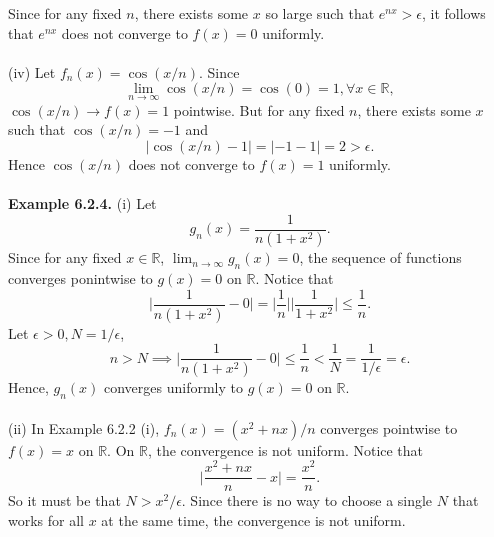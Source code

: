 \documentclass{article}
\begin{document}
           Since for any fixed $n$, there exists some $x$ so large such that $e^{nx} > \epsilon$, it follows that $e^{nx}$ does not converge to $f(x)=0$ uniformly.
           \\ \\
           (iv) Let $f_n(x) = \cos(x/n)$. Since
           \begin{equation*}
               \lim_{n \to \infty} \cos(x/n) = \cos(0) = 1, \forall x \in \mathbb{R},
           \end{equation*}
           $\cos(x/n) \to f(x)=1$ pointwise. But for any fixed $n$, there exists some $x$ such that $\cos(x/n)=-1$ and 
           \begin{equation*}
               |\cos(x/n)-1| = |-1-1| = 2 > \epsilon.
           \end{equation*}
           Hence $\cos(x/n)$ does not converge to $f(x)=1$ uniformly.
           \\ \\
           \textbf{Example 6.2.4.} (i) Let
           \begin{equation*}
               g_n(x) = \frac{1}{n(1+x^2)}.
           \end{equation*}
           Since for any fixed $x \in \mathbb{R}$, $\lim_{n \to \infty} g_n(x) = 0$, the sequence of functions converges ponintwise to $g(x)=0$ on $\mathbb{R}$. Notice that
           \begin{equation*}
               \bigg|\frac{1}{n(1+x^2)} - 0\bigg| = \bigg|\frac{1}{n}\bigg| \bigg|\frac{1}{1+x^2}\bigg| \leq \frac{1}{n}.
           \end{equation*}
           Let $\epsilon > 0, N = 1/\epsilon$,
           \begin{equation*}
               n > N \implies \bigg|\frac{1}{n(1+x^2)} - 0\bigg| \leq \frac{1}{n} < \frac{1}{N} = \frac{1}{1/\epsilon} = \epsilon.
           \end{equation*}
           Hence, $g_n(x)$ converges uniformly to $g(x)=0$ on $\mathbb{R}$.
           \\ \\
           (ii) In Example 6.2.2 (i), $f_n(x) = (x^2+nx)/n$ converges pointwise to $f(x)=x$ on $\mathbb{R}$. On $\mathbb{R}$, the convergence is not uniform. Notice that
           \begin{equation*}
               \bigg|\frac{x^2+nx}{n} - x\bigg| = \frac{x^2}{n}.
           \end{equation*}
           So it must be that $N > x^2/\epsilon$. Since there is no way to choose a single $N$ that works for all $x$ at the same time, the convergence is not uniform.
           
\end{document}
